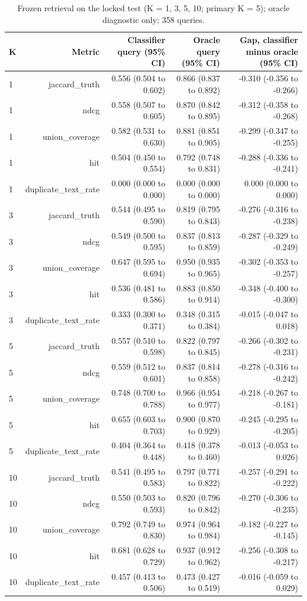 \begin{table}[t]
\centering
\scriptsize
\begin{tabular}{lrrrr}
\hline
K & Metric & Classifier query (95\% CI) & Oracle query (95\% CI) & Gap, classifier minus oracle (95\% CI) \\
\hline
1 & jaccard\_truth & 0.556 (0.504 to 0.602) & 0.866 (0.837 to 0.892) & -0.310 (-0.356 to -0.266) \\
1 & ndcg & 0.558 (0.507 to 0.605) & 0.870 (0.842 to 0.895) & -0.312 (-0.358 to -0.268) \\
1 & union\_coverage & 0.582 (0.531 to 0.630) & 0.881 (0.851 to 0.905) & -0.299 (-0.347 to -0.255) \\
1 & hit & 0.504 (0.450 to 0.554) & 0.792 (0.748 to 0.831) & -0.288 (-0.336 to -0.241) \\
1 & duplicate\_text\_rate & 0.000 (0.000 to 0.000) & 0.000 (0.000 to 0.000) & 0.000 (0.000 to 0.000) \\
3 & jaccard\_truth & 0.544 (0.495 to 0.590) & 0.819 (0.795 to 0.843) & -0.276 (-0.316 to -0.238) \\
3 & ndcg & 0.549 (0.500 to 0.595) & 0.837 (0.813 to 0.859) & -0.287 (-0.329 to -0.249) \\
3 & union\_coverage & 0.647 (0.595 to 0.694) & 0.950 (0.935 to 0.965) & -0.302 (-0.353 to -0.257) \\
3 & hit & 0.536 (0.481 to 0.586) & 0.883 (0.850 to 0.914) & -0.348 (-0.400 to -0.300) \\
3 & duplicate\_text\_rate & 0.333 (0.300 to 0.371) & 0.348 (0.315 to 0.384) & -0.015 (-0.047 to 0.018) \\
5 & jaccard\_truth & 0.557 (0.510 to 0.598) & 0.822 (0.797 to 0.845) & -0.266 (-0.302 to -0.231) \\
5 & ndcg & 0.559 (0.512 to 0.601) & 0.837 (0.814 to 0.858) & -0.278 (-0.316 to -0.242) \\
5 & union\_coverage & 0.748 (0.700 to 0.788) & 0.966 (0.954 to 0.977) & -0.218 (-0.267 to -0.181) \\
5 & hit & 0.655 (0.603 to 0.703) & 0.900 (0.870 to 0.929) & -0.245 (-0.295 to -0.205) \\
5 & duplicate\_text\_rate & 0.404 (0.364 to 0.448) & 0.418 (0.378 to 0.460) & -0.013 (-0.053 to 0.026) \\
10 & jaccard\_truth & 0.541 (0.495 to 0.583) & 0.797 (0.771 to 0.822) & -0.257 (-0.291 to -0.222) \\
10 & ndcg & 0.550 (0.503 to 0.593) & 0.820 (0.796 to 0.842) & -0.270 (-0.306 to -0.235) \\
10 & union\_coverage & 0.792 (0.749 to 0.830) & 0.974 (0.964 to 0.984) & -0.182 (-0.227 to -0.145) \\
10 & hit & 0.681 (0.628 to 0.729) & 0.937 (0.912 to 0.962) & -0.256 (-0.308 to -0.217) \\
10 & duplicate\_text\_rate & 0.457 (0.413 to 0.506) & 0.473 (0.427 to 0.519) & -0.016 (-0.059 to 0.029) \\
\hline
\end{tabular}
\caption{Frozen retrieval on the locked test (K = 1, 3, 5, 10; primary K = 5); oracle diagnostic only; 358 queries.}
\label{tab:table4_final_retrieval_metrics}
\end{table}
